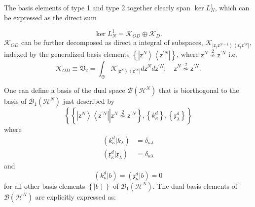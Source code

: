 \documentclass[aps,preprint]{revtex4}%
\begin{document}
The basis elements of type 1 and type 2 together clearly span $\ker L_{N}^{1}
$, which can be expressed as the direct sum%

\begin{equation}
\ker L_{N}^{1}=\mathcal{K}_{OD}\oplus\mathcal{K}_{D}.
\end{equation}
$\mathcal{K}_{OD}$ can be further decomposed as direct a integral
\cite{dirint} of subspaces, $\mathcal{K}_{\left\vert \mathsf{z}_{1}%
\mathsf{z}^{N-1}\right\rangle \left\langle \mathsf{z}_{1}^{\prime}%
\mathsf{z}^{\prime N}\right\vert }$, indexed by the generalized basis elements
$\left\{  \left\vert \mathsf{z}^{N}\right\rangle \left\langle \mathsf{z}%
^{\prime N}\right\vert \right\}  $, where $\mathsf{z}^{N}\overset{2}{\nsim
}\mathsf{z}^{\prime N}$ i.e.
\begin{equation}
\mathcal{K}_{OD}\equiv\mathfrak{V}_{2}=\int_{\oplus}\mathcal{K}_{\left\vert
\mathsf{z}^{N}\right\rangle \left\langle \mathsf{z}^{\prime N}\right\vert
}d\mathsf{z}^{N}d\mathsf{z}^{\prime N};\quad\mathsf{z}^{N}\overset{2}{\nsim
}\mathsf{z}^{\prime N}.
\end{equation}


One can define a basis of the dual space $\mathcal{B}\left(  \mathcal{H}%
^{N}\right)  $ that is biorthogonal to the basis of $\mathcal{B}_{1}\left(
\mathcal{H}^{N}\right)  $ just described by%
\begin{equation}
\left\{  \left\{  \left\vert \mathsf{z}^{N}\right\rangle \left\langle
\mathsf{z}^{\prime N}\right\vert \left\vert \mathsf{z}^{N}\overset{2}{\nsim
}\mathsf{z}^{\prime N}\right.  \right\}  ,\left\{  k_{\kappa}^{d}\right\}
,\left\{  \mathfrak{x}_{\lambda}^{d}\right\}  \right\}
\end{equation}
where
\begin{align}
\left(  k_{\kappa}^{d}|k_{\lambda}\right)   &  =\delta_{\kappa\lambda
}\nonumber\\
\left(  \mathfrak{x}_{\kappa}^{d}|\mathfrak{x}_{\lambda}\right)   &
=\delta_{\kappa\lambda}%
\end{align}
and
\begin{equation}
\left(  k_{\kappa}^{d}|b\right)  =\left(  \mathfrak{x}_{\kappa}^{d}|b\right)
=0
\end{equation}
for all other basis elements $\left\{  \left\vert b\right)  \right\}  $ of
$\mathcal{B}_{1}\left(  \mathcal{H}^{N}\right)  .$ The dual basis elements of
$\mathcal{B}\left(  \mathcal{H}^{N}\right)  $ are explicitly expressed as:
\end{document}
